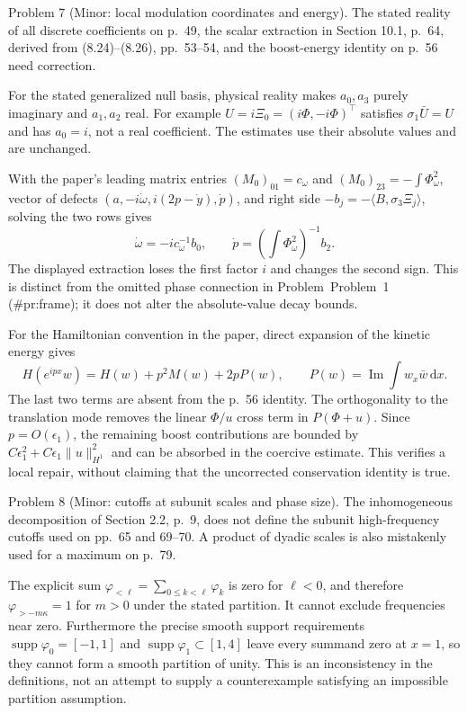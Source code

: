 \documentclass[10pt]{article}
\begin{document}
Problem 7 (Minor: local modulation coordinates and energy).  The stated reality of all discrete coefficients on p. 49, the scalar extraction in Section 10.1, p. 64, derived from (8.24)–(8.26), pp. 53–54, and the boost-energy identity on p. 56 need correction.\par
For the stated generalized null basis, physical reality makes \(a_0,a_3\) purely imaginary and \(a_1,a_2\) real. For example \(U=i\Xi_0=(i\Phi,-i\Phi)^\top\) satisfies \(\sigma_1\bar U=U\) and has \(a_0=i\), not a real coefficient. The estimates use their absolute values and are unchanged.\par
With the paper’s leading matrix entries \((M_0)_{01}=c_\omega\) and \((M_0)_{23}=-\int\Phi_\omega^2\), vector of defects \((a,-i\dot\omega,i(2p-\dot y),\dot p)\), and right side \(-b_j=-\langle B,\sigma_3\Xi_j\rangle\), solving the two rows gives \[\dot\omega=-i c_\omega^{-1}b_0,\qquad
 \dot p=\left(\int\Phi_\omega^2\right)^{-1}b_2 .\] The displayed extraction loses the first factor \(i\) and changes the second sign. This is distinct from the omitted phase connection in Problem Problem 1 (\#pr:frame); it does not alter the absolute-value decay bounds.\par
For the Hamiltonian convention in the paper, direct expansion of the kinetic energy gives \[H(e^{ipx}w)=H(w)+p^2M(w)+2pP(w),\qquad
 P(w)=\operatorname{Im}\int w_x\bar w\,\mathrm dx.\] The last two terms are absent from the p. 56 identity. The orthogonality to the translation mode removes the linear \(\Phi/u\) cross term in \(P(\Phi+u)\). Since \(p=O(\epsilon_1)\), the remaining boost contributions are bounded by \(C\epsilon_1^2+
C\epsilon_1\|u\|_{H^1}^2\) and can be absorbed in the coercive estimate. This verifies a local repair, without claiming that the uncorrected conservation identity is true.\par
Problem 8 (Minor: cutoffs at subunit scales and phase size).  The inhomogeneous decomposition of Section 2.2, p. 9, does not define the subunit high-frequency cutoffs used on pp. 65 and 69–70. A product of dyadic scales is also mistakenly used for a maximum on p. 79.\par
The explicit sum \(\varphi_{<\ell}=\sum_{0\le k<\ell}\varphi_k\) is zero for \(\ell<0\), and therefore \(\varphi_{>-m\kappa}=1\) for \(m>0\) under the stated partition. It cannot exclude frequencies near zero. Furthermore the precise smooth support requirements \(\mathop{\mathrm{supp}}\varphi_0=[-1,1]\) and \(\mathop{\mathrm{supp}}\varphi_1\subset[1,4]\) leave every summand zero at \(x=1\), so they cannot form a smooth partition of unity. This is an inconsistency in the definitions, not an attempt to supply a counterexample satisfying an impossible partition assumption.\par
\end{document}
